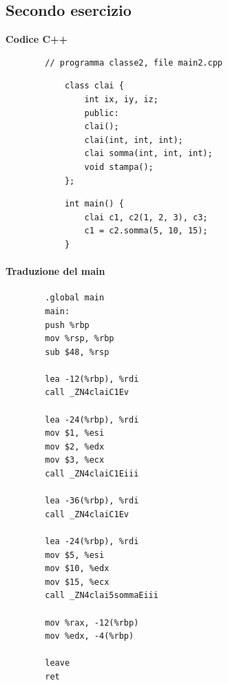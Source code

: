 \subsection{Secondo esercizio}
\begin{framed}
	\noindent \textbf{Codice C++}
	\begin{verbatim}
		// programma classe2, file main2.cpp
	\end{verbatim}
	\begin{multicols}{2}
		\begin{verbatim}
			class clai { 
				int ix, iy, iz;
				public:
				clai();
				clai(int, int, int);
				clai somma(int, int, int);
				void stampa();
			};
		\end{verbatim}
		\columnbreak
		\begin{verbatim}
			int main() { 
				clai c1, c2(1, 2, 3), c3;
				c1 = c2.somma(5, 10, 15); 
			}
		\end{verbatim}
	\end{multicols}
\end{framed}
\begin{multicols}{2}
	\paragraph{Traduzione del main}
	\begin{verbatim}
		.global main
		main:
		push %rbp
		mov %rsp, %rbp
		sub $48, %rsp
		
		lea -12(%rbp), %rdi
		call _ZN4claiC1Ev
		
		lea -24(%rbp), %rdi
		mov $1, %esi
		mov $2, %edx
		mov $3, %ecx
		call _ZN4claiC1Eiii
		
		lea -36(%rbp), %rdi
		call _ZN4claiC1Ev
		
		lea -24(%rbp), %rdi
		mov $5, %esi
		mov $10, %edx
		mov $15, %ecx
		call _ZN4clai5sommaEiii
		
		mov %rax, -12(%rbp)
		mov %edx, -4(%rbp)
		
		leave
		ret
	\end{verbatim}
\end{multicols}

